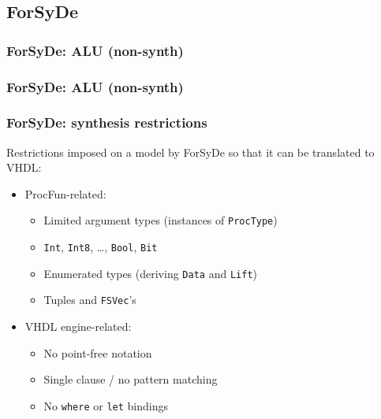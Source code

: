 \documentclass{beamer}
\begin{document}
        \subsection{ForSyDe}
        \label{subsec:forsyde}

            \begin{frame}
                \frametitle{ForSyDe: ALU (non-synth)}
            \end{frame}

            \begin{frame}
                \frametitle{ForSyDe: ALU (non-synth)}
            \end{frame}

            \begin{frame}
                \frametitle{ForSyDe: synthesis restrictions}
                \par{Restrictions imposed on a model by ForSyDe so that it can be translated to VHDL:}
                \begin{itemize}
                    \item ProcFun-related:
                        \begin{itemize}
                            \item Limited argument types (instances of \texttt{ProcType})
                            \item \texttt{Int}, \texttt{Int8}, \ldots, \texttt{Bool}, \texttt{Bit}
                            \item Enumerated types (deriving \texttt{Data} and \texttt{Lift})
                            \item Tuples and \texttt{FSVec}'s
                        \end{itemize}
                    \item VHDL engine-related:
                        \begin{itemize}
                            \item No point-free notation
                            \item Single clause / no pattern matching
                            \item No \texttt{where} or \texttt{let} bindings
                        \end{itemize}
                \end{itemize}
            \end{frame}
\end{document}
